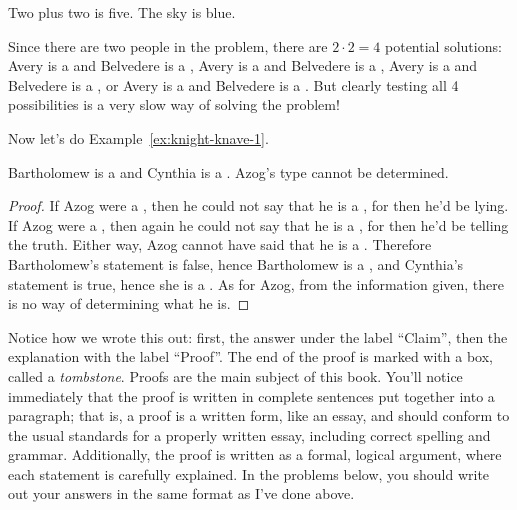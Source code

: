 \documentclass{tufte-book}
\begin{document}
\begin{dialogue}
   Two plus two is five.
   The sky is blue.
\end{dialogue}

Since there are two people in the problem, there are $2 \cdot 2 = 4$ potential solutions:   Avery is a \knight and Belvedere is a \knight, Avery is a \knight and Belvedere is a \knave, Avery is a \knave and Belvedere is a \knight, or Avery is a \knave and Belvedere is a \knave. But clearly testing all 4 possibilities is a very slow way of solving the problem! 

Now let's do Example~\ref{ex:knight-knave-1}.
\begin{claim}
  Bartholomew is a \knave and Cynthia is a \knight. Azog's type cannot be determined.
\end{claim}

\begin{proof}
  If Azog were a \knight, then he could not say that he is a \knave, for then he'd be lying. If Azog were a \knave, then again he could not say that he is a \knave, for then he'd be telling the truth. Either way, Azog cannot have said that he is a \knave. Therefore Bartholomew's statement is false,  hence Bartholomew is a \knave, and Cynthia's statement is true, hence she is a \knight. As for Azog, from the information given, there is no way of determining what he is.
\end{proof}


Notice how we wrote this out: first, the answer under the label ``Claim'', then the explanation with the label ``Proof''. The end of the proof is marked with a box, called a \emph{tombstone}. Proofs are the main subject of this book. You'll notice immediately that the proof is written in complete sentences put together into a paragraph; that is, a proof is a written form, like an essay, and should conform to the usual standards for a properly written essay, including correct spelling and grammar. Additionally, the proof is written as a formal, logical argument, where each statement is carefully explained. In the problems below, you should write out your answers in the same format as I've done above.
\end{document}

